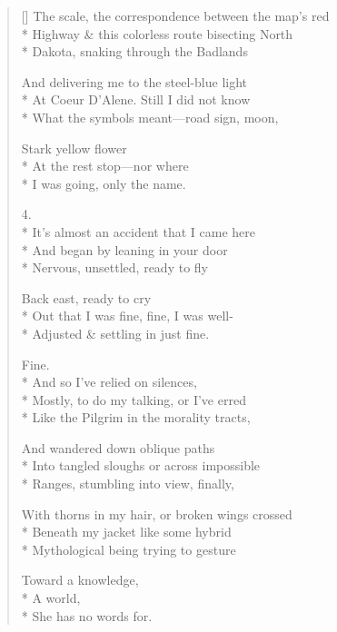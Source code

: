 \begin{verse}[\versewidth]
The scale, the correspondence between the map's red\\*
Highway \& this colorless route bisecting North\\*
Dakota, snaking through the Badlands

And delivering me to the steel-blue light\\*
At Coeur D'Alene. Still I did not know\\*
What the symbols meant---road sign, moon,

Stark yellow flower\\*
At the rest stop---nor where\\*
I was going, only the name.

4.\\*
It's almost an accident that I came here\\*
And began by leaning in your door\\*
Nervous, unsettled, ready to fly

Back east, ready to cry\\*
Out that I was fine, fine, I was well-\\*
Adjusted \& settling in just fine.

Fine.\\*
 \qquad And so I've relied on silences,\\*
Mostly, to do my talking, or I've erred\\*
Like the Pilgrim in the morality tracts,

And wandered down oblique paths\\*
Into tangled sloughs or across impossible\\*
Ranges, stumbling into view, finally,

With thorns in my hair, or broken wings crossed\\*
Beneath my jacket like some hybrid\\*
Mythological being trying to gesture

Toward a knowledge,\\*
A world,\\*
She has no words for.
\end{verse}
